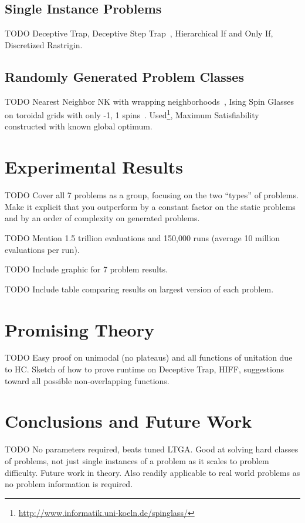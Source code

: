 \documentclass{sig-alternate}
\begin{document}
\subsection{Single Instance Problems}
TODO Deceptive Trap, Deceptive Step Trap~\cite{goldman:2012:ltga}, Hierarchical If
and Only If, Discretized Rastrigin.

\subsection{Randomly Generated Problem Classes}
TODO Nearest Neighbor NK with wrapping neighborhoods~\cite{wright:2000:solvingnk}, Ising Spin Glasses on toroidal
grids with only -1, 1 spins~\cite{saul:1994:spinglass}.
Used\footnote{\url{http://www.informatik.uni-koeln.de/spinglass/}}, Maximum Satisfiability constructed with known global
optimum.

\section{Experimental Results}
TODO Cover all 7 problems as a group, focusing on the two ``types'' of problems.
Make it explicit that you outperform by a constant factor on the static problems
and by an order of complexity on generated problems.

TODO Mention 1.5 trillion evaluations and 150,000 runs (average 10 million evaluations per run).

TODO Include graphic for 7 problem results.

TODO Include table comparing results on largest version of each problem.

\section{Promising Theory}
TODO Easy proof on unimodal (no plateaus) and all functions of unitation due to HC.
Sketch of how to prove runtime on Deceptive Trap, HIFF, suggestions toward all
possible non-overlapping functions.

\section{Conclusions and Future Work}
TODO No parameters required, beats tuned LTGA.  Good at solving hard classes
of problems, not just single instances of a problem as it scales to problem difficulty.
Future work in theory.  Also readily applicable to real world problems as no
problem information is required.

%

%
%
\balancecolumns
\end{document}
